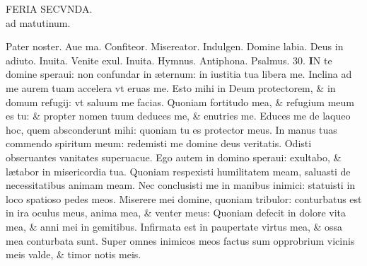 \documentclass[a5paper,10pt]{book}
\def\ae{æ}
\begin{document}
\begin{multicols*}{2}
\begin{center}
FERIA SECVNDA.\\
\normalsize ad matutinum.
\end{center}
\vspace{-1em}
\par \noindent \color{red} P\color{black}ater noster. Aue ma. Confiteor. Misereator. Indulgen. Domine labia. Deus in adiuto. \color{red} Inuita. \color{black} Venite exul. \color{red} Inuita. Hymnus. Antiphona. \quad Psalmus. \hypertarget{ps30}{30.} \color{black}
\lettrine[lines=2]{\bfseries \color{red} I}{}N te domine speraui: non confundar in \ae ternum: in iustitia tua libera me.
\newline \color{red} I\color{black}nclina ad me aurem tuam accelera vt eruas me.
\newline \color{red} E\color{black}sto mihi in Deum protectorem, \& in domum refugij: vt saluum me facias.
\newline \color{red} Q\color{black}uoniam fortitudo mea, \& refugium meum es tu: \& propter nomen tuum deduces me, \& enutries me.
\newline \color{red} E\color{black}duces me de laqueo hoc, quem absconderunt mihi: quoniam tu es protector meus.
\newline \color{red} I\color{black}n manus tuas commendo spiritum meum: redemisti me domine deus veritatis.
\newline \color{red} O\color{black}disti obseruantes vanitates superuacue.
\newline \color{red} E\color{black}go autem in domino speraui: exultabo, \& l\ae tabor in misericordia tua.
\newline \color{red} Q\color{black}uoniam respexisti humilitatem meam, saluasti de necessitatibus animam meam.
\newline \color{red} N\color{black}ec conclusisti me in manibus inimici: statuisti in loco spatioso pedes meos.
\newline \color{red} M\color{black}iserere mei domine, quoniam tribulor: conturbatus est in ira oculus meus, anima mea, \& venter meus:
\newline \color{red} Q\color{black}uoniam defecit in dolore vita mea, \& anni mei in gemitibus.
\newline \color{red} I\color{black}nfirmata est in paupertate virtus mea, \& ossa mea conturbata sunt.
\newline \color{red} S\color{black}uper omnes inimicos meos factus sum opprobrium vicinis meis valde, \& timor notis meis.

\end{multicols*}
\end{document}
